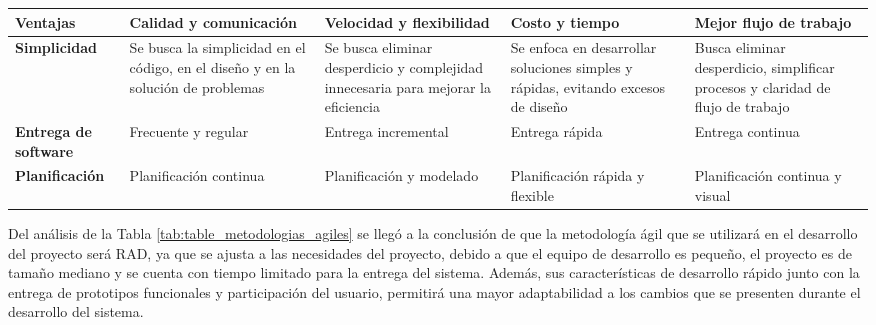 \begin{footnotesize}
\begin{spacing}{1}
\begin{center}
\begin{longtable}[l]{ |>{\bfseries}p{}| p{} |p{}  |p{} | p{}|}
            \hline
            Ventajas & Calidad y comunicación & Velocidad y flexibilidad & Costo y tiempo & Mejor flujo de trabajo \\
            \hline
            Simplicidad                            & Se busca la simplicidad en el código, en el diseño y en la solución de problemas & Se busca eliminar desperdicio y complejidad innecesaria para mejorar la eficiencia & Se enfoca en desarrollar soluciones simples y rápidas, evitando excesos de diseño & Busca eliminar desperdicio, simplificar procesos y claridad de flujo de trabajo \\
            \hline
            Entrega de software                    & Frecuente y regular                                                                                    & Entrega incremental                                                                            & Entrega rápida                                                                             & Entrega continua                                                                        \\
            \hline
            Planificación                          & Planificación continua                                                                                 & Planificación y modelado                                                                       & Planificación rápida y flexible & Planificación continua y visual \\
            \hline
        \end{longtable}

    \end{center}
\end{spacing}
\end{footnotesize}

Del análisis de la Tabla \ref{tab:table_metodologias_agiles} se llegó a la conclusión de que la metodología ágil que se utilizará en el desarrollo del proyecto será RAD, ya que se ajusta a las necesidades del proyecto, debido a que el equipo de desarrollo es pequeño, el proyecto es de tamaño mediano y se cuenta con tiempo limitado para la entrega del sistema.
Además, sus características de desarrollo rápido junto con la entrega de prototipos funcionales y participación del usuario, permitirá una mayor adaptabilidad a los cambios que se presenten durante el desarrollo del sistema.
